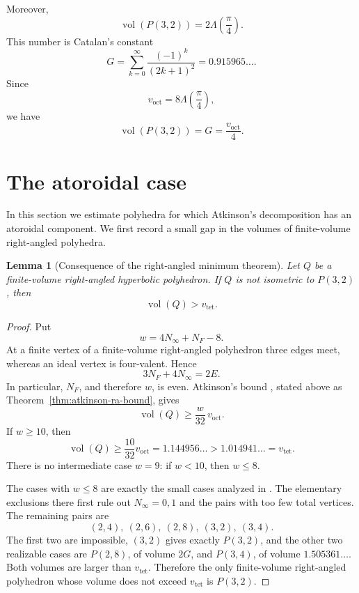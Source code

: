 \documentclass[12pt,a4paper]{article}
\newtheorem{lemma}[theorem]{Lemma}
\theoremstyle{definition}
\DeclareMathOperator{\Vol}{vol}
\newcommand{\voct}{v_{\mathrm{oct}}}
\newcommand{\vtet}{v_{\mathrm{tet}}}
\newcommand{\Gcat}{G}
\begin{document}
Moreover,
\[
        \Vol(P(3,2))=2\Lambda\left(\frac{\pi}{4}\right).
\]
This number is Catalan's constant
\[
        G=\sum_{k=0}^{\infty}\frac{(-1)^k}{(2k+1)^2}=0.915965\ldots .
\]
Since
\[
        \voct=8\Lambda\left(\frac{\pi}{4}\right),
\]
we have
\begin{equation}\label{eq:p32-volume}
        \Vol(P(3,2))=G=\frac{\voct}{4}.
\end{equation}
\section{The atoroidal case}

In this section we estimate polyhedra for which Atkinson's decomposition has an atoroidal component. We first record a small gap in the volumes of finite-volume right-angled polyhedra.

\begin{lemma}[Consequence of the right-angled minimum theorem]
\label{lem:ra-gap}
Let \(Q\) be a finite-volume right-angled hyperbolic polyhedron. If \(Q\) is not isometric to \(P(3,2)\), then
\[
        \Vol(Q)>\vtet.
\]
\end{lemma}

\begin{proof}
Put
\[
        w=4N_\infty+N_F-8.
\]
At a finite vertex of a finite-volume right-angled polyhedron three edges
meet, whereas an ideal vertex is four-valent.  Hence
\[
        3N_F+4N_\infty=2E.
\]
In particular, \(N_F\), and therefore \(w\), is even.  Atkinson's
bound \cite[Theorem~10]{Atkinson2011}, stated above as
Theorem~\ref{thm:atkinson-ra-bound}, gives
\[
        \Vol(Q)\ge
        \frac{w}{32}\,\voct .
\]
If \(w\ge10\), then
\[
        \Vol(Q)\ge \frac{10}{32}\voct
        =1.144956\ldots>1.014941\ldots=\vtet .
\]
There is no intermediate case \(w=9\): if \(w<10\), then \(w\le8\).

The cases with \(w\le8\) are exactly the small cases analyzed in
\cite[Lemmas~3.1--3.4]{EgorovP32}.  The elementary exclusions there first
rule out \(N_\infty=0,1\) and the pairs with too few total vertices.  The
remaining pairs are
\[
 (2,4),\ (2,6),\ (2,8),\ (3,2),\ (3,4).
\]
The first two are impossible, \((3,2)\) gives exactly \(P(3,2)\), and the
other two realizable cases are \(P(2,8)\), of volume \(2\Gcat\), and
\(P(3,4)\), of volume \(1.505361\ldots\).  Both volumes are larger than
\(\vtet\).  Therefore the only finite-volume right-angled polyhedron whose
volume does not exceed \(\vtet\) is \(P(3,2)\).
\end{proof}
\end{document}
